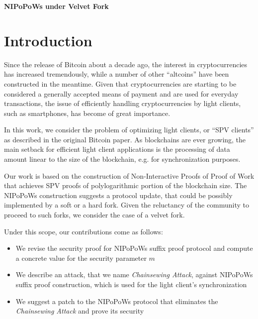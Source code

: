 \documentclass[11pt,a4paper]{article}
\begin{document}
\begin{center}
\begin{Large}
\textbf{NIPoPoWs under Velvet Fork\\}
\end{Large}

\end{center}

\section{Introduction}
Since the release of Bitcoin about a decade ago, the interest in cryptocurrencies has increased tremendously, while a number of other ``altcoins'' have been constructed in the meantime. Given that cryptocurrencies are starting to be considered a generally accepted means of payment and are used for everyday transactions, the issue of efficiently handling cryptocurrencies by light clients, such as smartphones, has become of great importance.

In this work, we consider the problem of optimizing light clients, or ``SPV clients'' as described in the original Bitcoin paper\cite{Nakamoto}. As blockchains are ever growing, the main setback for efficient light client applications is the processing of data amount linear to the size of the blockchain, e.g. for synchronization purposes. 

Our work is based on the construction of Non-Interactive Proofs of Proof of Work\cite{NIPoPoWs} that achieves SPV proofs of polylogarithmic portion of the blockchain size. The NIPoPoWs construction suggests a protocol update, that could be possibly implemented by a soft or a hard fork. Given the reluctancy of the community to proceed to such forks, we consider the case of a velvet fork\cite{NIPoPoWs}\cite{Zamyatin}.

Under this scope, our contributions come as follows:
\begin{itemize}
	\item We revise the security proof for NIPoPoWs suffix proof protocol and compute a concrete value for the security parameter $m$
	\item We describe an attack, that we name \textit{Chainsewing Attack}, against NIPoPoWs suffix proof construction, which is used for the light client's synchronization
	\item We suggest a patch to the NIPoPoWs protocol that eliminates the \textit{Chainsewing Attack} and prove its security
\end{itemize}
\end{document}
